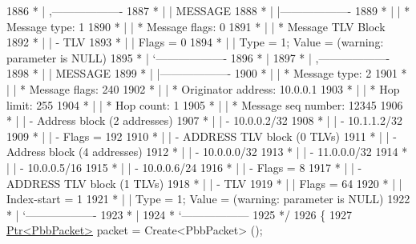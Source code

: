 \begin{DoxyCode}
1886 \textcolor{comment}{         * |    ,-------------------}
1887 \textcolor{comment}{         * |    |  MESSAGE}
1888 \textcolor{comment}{         * |    |-------------------}
1889 \textcolor{comment}{         * |    | * Message type:       1}
1890 \textcolor{comment}{         * |    | * Message flags:  0}
1891 \textcolor{comment}{         * |    | * Message TLV Block}
1892 \textcolor{comment}{         * |    |     - TLV}
1893 \textcolor{comment}{         * |    |         Flags = 0}
1894 \textcolor{comment}{         * |    |         Type = 1; Value = (warning: parameter is NULL)}
1895 \textcolor{comment}{         * |    `-------------------}
1896 \textcolor{comment}{         * |}
1897 \textcolor{comment}{         * |    ,-------------------}
1898 \textcolor{comment}{         * |    |  MESSAGE}
1899 \textcolor{comment}{         * |    |-------------------}
1900 \textcolor{comment}{         * |    | * Message type:       2}
1901 \textcolor{comment}{         * |    | * Message flags:  240}
1902 \textcolor{comment}{         * |    | * Originator address: 10.0.0.1}
1903 \textcolor{comment}{         * |    | * Hop limit:          255}
1904 \textcolor{comment}{         * |    | * Hop count:          1}
1905 \textcolor{comment}{         * |    | * Message seq number: 12345}
1906 \textcolor{comment}{         * |    | - Address block (2 addresses)}
1907 \textcolor{comment}{         * |    |     - 10.0.0.2/32}
1908 \textcolor{comment}{         * |    |     - 10.1.1.2/32}
1909 \textcolor{comment}{         * |    |     - Flags = 192}
1910 \textcolor{comment}{         * |    | - ADDRESS TLV block (0 TLVs)}
1911 \textcolor{comment}{         * |    | - Address block (4 addresses)}
1912 \textcolor{comment}{         * |    |     - 10.0.0.0/32}
1913 \textcolor{comment}{         * |    |     - 11.0.0.0/32}
1914 \textcolor{comment}{         * |    |     - 10.0.0.5/16}
1915 \textcolor{comment}{         * |    |     - 10.0.0.6/24}
1916 \textcolor{comment}{         * |    |     - Flags = 8}
1917 \textcolor{comment}{         * |    | - ADDRESS TLV block (1 TLVs)}
1918 \textcolor{comment}{         * |    |     - TLV}
1919 \textcolor{comment}{         * |    |         Flags = 64}
1920 \textcolor{comment}{         * |    |         Index-start = 1}
1921 \textcolor{comment}{         * |    |         Type = 1; Value = (warning: parameter is NULL)}
1922 \textcolor{comment}{         * |    `-------------------}
1923 \textcolor{comment}{         * |}
1924 \textcolor{comment}{         * `------------------}
1925 \textcolor{comment}{   */}
1926   \{
1927     \hyperlink{classns3_1_1Ptr}{Ptr<PbbPacket>} packet = Create<PbbPacket> ();

\end{DoxyCode}
